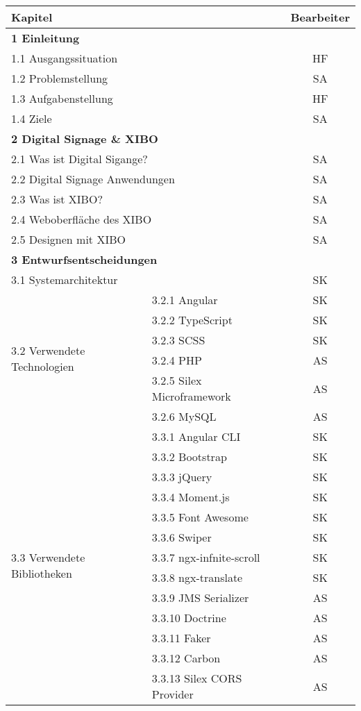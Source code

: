 \begin{longtable}{| l | l | c |}
\multicolumn{2}{l}{\textbf{Kapitel}} & \multicolumn{1}{c}{\textbf{Bearbeiter}} \\ \hline
\multicolumn{3}{|l|}{\textbf{1 Einleitung}} \\ \hline
\multicolumn{2}{|l|}{1.1 Ausgangssituation} & HF \\
\multicolumn{2}{|l|}{1.2 Problemstellung} & SA \\
\multicolumn{2}{|l|}{1.3 Aufgabenstellung} & HF \\
\multicolumn{2}{|l|}{1.4 Ziele} & SA \\ \hline

\multicolumn{3}{|l|}{\textbf{2 Digital Signage \& XIBO}} \\ \hline
\multicolumn{2}{|l|}{2.1 Was ist Digital Sigange?} & SA \\
\multicolumn{2}{|l|}{2.2 Digital Signage Anwendungen} & SA \\
\multicolumn{2}{|l|}{2.3 Was ist XIBO?} & SA \\ \hline
\multicolumn{2}{|l|}{2.4 Weboberfläche des XIBO} & SA \\ \hline
\multicolumn{2}{|l|}{2.5 Designen mit XIBO} & SA \\ \hline

\multicolumn{3}{|l|}{\textbf{3 Entwurfsentscheidungen}} \\ \hline
\multicolumn{2}{|l|}{3.1 Systemarchitektur} & SK \\ \hline
\multirow{6}{*}{3.2 Verwendete Technologien}  
& 3.2.1 Angular & SK \\
& 3.2.2 TypeScript & SK \\
& 3.2.3 SCSS & SK \\
& 3.2.4 PHP & AS \\
& 3.2.5 Silex Microframework & AS \\
& 3.2.6 MySQL & AS \\ \hline
\multirow{13}{*}{3.3 Verwendete Bibliotheken}
& 3.3.1 Angular CLI & SK \\
& 3.3.2 Bootstrap & SK \\
& 3.3.3 jQuery & SK \\
& 3.3.4 Moment.js & SK \\
& 3.3.5 Font Awesome & SK \\
& 3.3.6 Swiper & SK \\ 
& 3.3.7 ngx-infnite-scroll & SK \\
& 3.3.8 ngx-translate & SK \\
& 3.3.9 JMS Serializer & AS \\
& 3.3.10 Doctrine & AS \\
& 3.3.11 Faker & AS \\
& 3.3.12 Carbon & AS \\
& 3.3.13 Silex CORS Provider & AS \\ \hline


\end{longtable}
